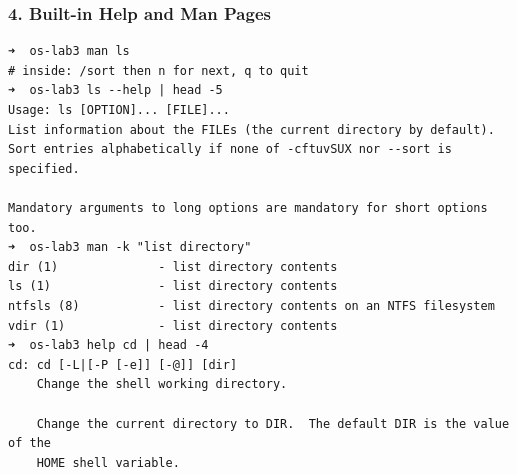 \documentclass{labreport}
\begin{document}
\subsubsection{4. Built-in Help and Man Pages}
\begin{lstlisting}[style=bash]
➜  os-lab3 man ls
# inside: /sort then n for next, q to quit
➜  os-lab3 ls --help | head -5
Usage: ls [OPTION]... [FILE]...
List information about the FILEs (the current directory by default).
Sort entries alphabetically if none of -cftuvSUX nor --sort is specified.

Mandatory arguments to long options are mandatory for short options too.
➜  os-lab3 man -k "list directory"
dir (1)              - list directory contents
ls (1)               - list directory contents
ntfsls (8)           - list directory contents on an NTFS filesystem
vdir (1)             - list directory contents
➜  os-lab3 help cd | head -4
cd: cd [-L|[-P [-e]] [-@]] [dir]
    Change the shell working directory.

    Change the current directory to DIR.  The default DIR is the value of the
    HOME shell variable.
\end{lstlisting}
\end{document}

